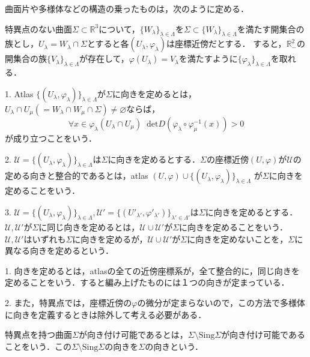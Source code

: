 \documentclass[uplatex, dvipdfmx]{jsreport}
\begin{document}
曲面片や多様体などの構造の乗ったものは，次のように定める．
\begin{definition}[特異点のない曲面の向き]
    特異点のない曲面$\Sigma\subset\mathbb{R}^3$について，$\{W_\lambda\}_{\lambda\in\Lambda}$を$\Sigma\subset\{W_\lambda\}_{\lambda\in\Lambda}$を満たす開集合の族とし，$U_\lambda=W_\lambda\cap\Sigma$とすると各$(U_\lambda,\varphi_\lambda)$は座標近傍だとする．
    すると，$\mathbb{R}^2_-$の開集合の族$\{V_\lambda\}_{\lambda\in\Lambda}$が存在して，$\varphi(U_\lambda)=V_\lambda$を満たすように$\{\varphi_\lambda\}_{\lambda\in\Lambda}$を取れる．

    1. Atlas $\{(U_\lambda,\varphi_\lambda)\}_{\lambda\in\Lambda}$が$\Sigma$に向きを定めるとは，$U_\lambda\cap U_\mu(=W_\lambda\cap W_\mu\cap\Sigma)\ne\varnothing$ならば，
    \[ \forall x\in\varphi_\lambda(U_\lambda\cap U_\mu)\;\;\mathrm{det}D(\varphi_\lambda\circ\varphi^{-1}_\mu(x))>0 \]
    が成り立つことをいう．

    2. $\mathcal{U}=\{(U_\lambda,\varphi_\lambda)\}_{\lambda\in\Lambda}$は$\Sigma$に向きを定めるとする．$\Sigma$の座標近傍$(U,\varphi)$が$\mathcal{U}$の定める向きと整合的であるとは，atlas $(U,\varphi)\cup\{(U_\lambda,\varphi_\lambda)\}_{\lambda\in\Lambda}$
    が$\Sigma$に向きを定めることをいう．

    3. $\mathcal{U}=\{(U_\lambda,\varphi_\lambda)\}_{\lambda\in\Lambda}, \mathcal{U'}=\{(U'_{\lambda'},\varphi'_{\lambda'})\}_{\lambda'\in\Lambda'}$は$\Sigma$に向きを定めるとする．$\mathcal{U,U'}$が$\Sigma$に同じ向きを定めるとは，$\mathcal{U\cup U'}$が$\Sigma$に向きを定めることをいう．
    $\mathcal{U,U'}$はいずれも$\Sigma$に向きを定めるが，$\mathcal{U\cup U'}$が$\Sigma$に向きを定めないことを，$\Sigma$に異なる向きを定めるという．
\end{definition}
\begin{remark*}
    1. 向きを定めるとは，atlasの全ての近傍座標系が，全て整合的に，同じ向きを定めることをいう．すると編み上げたものには１つの向きが定まっている．

    2. また，特異点では，座標近傍の$\varphi$の微分が定まらないので，この方法で多様体に向きを定義するときは除外して考える必要がある．
\end{remark*}

\begin{definition}[特異点のある曲面の向き]
    特異点を持つ曲面$\Sigma$が向き付け可能であるとは，$\Sigma\setminus\mathrm{Sing}\Sigma$が向き付け可能であることをいう．この$\Sigma\setminus\mathrm{Sing}\Sigma$の向きを$\Sigma$の向きという．
\end{definition}
\end{document}
